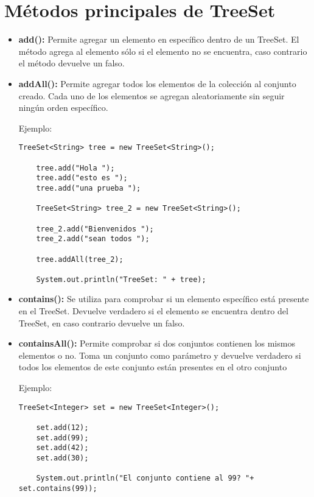 \documentclass[12pt, letterpaper]{article} %
\begin{document}
\section*{Métodos principales de TreeSet}
\begin{itemize}
    \item \textbf{add():} Permite agregar un elemento en específico dentro de un TreeSet. El método agrega al elemento sólo si el elemento no se encuentra, caso contrario el método devuelve un falso.
    
    \item \textbf{addAll():} Permite agregar todos los elementos de la colección al conjunto creado. Cada uno de los elementos se agregan aleatoriamente sin seguir ningún orden específico.
    
    Ejemplo:
    \lstset{language = Java, breaklines=true, basicstyle=\footnotesize}
    \begin{lstlisting}[frame=single]
    TreeSet<String> tree = new TreeSet<String>();

    tree.add("Hola ");
    tree.add("esto es ");
    tree.add("una prueba ");

    TreeSet<String> tree_2 = new TreeSet<String>();

    tree_2.add("Bienvenidos ");
    tree_2.add("sean todos ");

    tree.addAll(tree_2);

    System.out.println("TreeSet: " + tree);
    \end{lstlisting}

    \item \textbf{contains():} Se utiliza para comprobar si un elemento específico está presente en el TreeSet. Devuelve verdadero si el elemento se encuentra dentro del TreeSet, en caso contrario devuelve un falso.

    \item \textbf{containsAll():} Permite comprobar si dos conjuntos contienen los mismos elementos o no. Toma un conjunto como parámetro y devuelve verdadero si todos los elementos de este conjunto están presentes en el otro conjunto
    
    Ejemplo:
    \lstset{language = Java, breaklines=true, basicstyle=\footnotesize}
    \begin{lstlisting}[frame=single]
    TreeSet<Integer> set = new TreeSet<Integer>();

    set.add(12);
    set.add(99);
    set.add(42);
    set.add(30);

    System.out.println("El conjunto contiene al 99? "+ set.contains(99));


\end{lstlisting}
\end{itemize}
\end{document}

